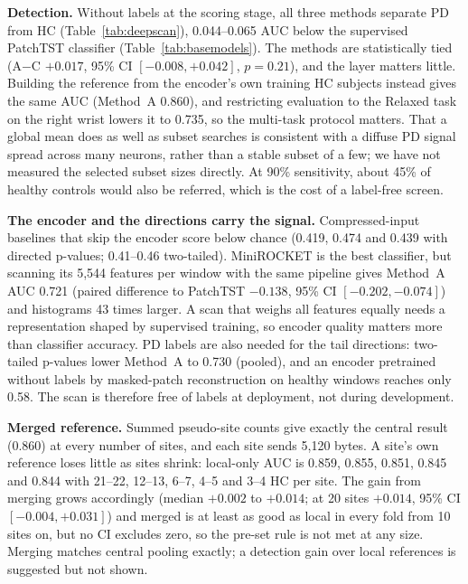 \documentclass{article}
\begin{document}
\textbf{Detection.} Without labels at the scoring stage, all three methods separate PD from HC (Table~\ref{tab:deepscan}), 0.044--0.065 AUC below the supervised PatchTST classifier (Table~\ref{tab:basemodels}). The methods are statistically tied (A$-$C $+0.017$, 95\% CI $[-0.008, +0.042]$, $p{=}0.21$), and the layer matters little. Building the reference from the encoder's own training HC subjects instead gives the same AUC (Method~A 0.860), and restricting evaluation to the Relaxed task on the right wrist lowers it to 0.735, so the multi-task protocol matters. That a global mean does as well as subset searches is consistent with a diffuse PD signal spread across many neurons, rather than a stable subset of a few; we have not measured the selected subset sizes directly. At 90\% sensitivity, about 45\% of healthy controls would also be referred, which is the cost of a label-free screen.

\textbf{The encoder and the directions carry the signal.} Compressed-input baselines that skip the encoder score below chance (0.419, 0.474 and 0.439 with directed p-values; 0.41--0.46 two-tailed). MiniROCKET is the best classifier, but scanning its 5{,}544 features per window with the same pipeline gives Method~A AUC 0.721 (paired difference to PatchTST $-0.138$, 95\% CI $[-0.202, -0.074]$) and histograms 43 times larger. A scan that weighs all features equally needs a representation shaped by supervised training, so encoder quality matters more than classifier accuracy. PD labels are also needed for the tail directions: two-tailed p-values lower Method~A to 0.730 (pooled), and an encoder pretrained without labels by masked-patch reconstruction on healthy windows reaches only 0.58. The scan is therefore free of labels at deployment, not during development.

\textbf{Merged reference.} Summed pseudo-site counts give exactly the central result (0.860) at every number of sites, and each site sends 5{,}120 bytes. A site's own reference loses little as sites shrink: local-only AUC is 0.859, 0.855, 0.851, 0.845 and 0.844 with 21--22, 12--13, 6--7, 4--5 and 3--4 HC per site. The gain from merging grows accordingly (median $+0.002$ to $+0.014$; at 20 sites $+0.014$, 95\% CI $[-0.004, +0.031]$) and merged is at least as good as local in every fold from 10 sites on, but no CI excludes zero, so the pre-set rule is not met at any size. Merging matches central pooling exactly; a detection gain over local references is suggested but not shown.
\end{document}
